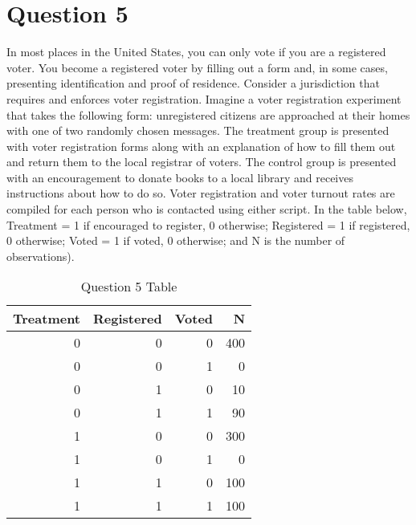 \documentclass[11pt,notitlepage]{article}\usepackage[]{graphicx}\usepackage[]{color}
\begin{document}
\section*{Question 5}
In most places in the United States, you can only vote if you are a registered voter. You become a registered voter by filling out a form and, in some cases, presenting identification and proof of residence. Consider a jurisdiction that requires and enforces voter registration. Imagine a voter registration experiment that takes the following form: unregistered citizens are approached at their homes with one of two randomly chosen messages. The treatment group is presented with voter registration forms along with an explanation of how to fill them out and return them to the local registrar of voters. The control group is presented with an encouragement to donate books to a local library and receives instructions about how to do so. Voter registration and voter turnout rates are compiled for each person who is contacted using either script. In the table below, Treatment = 1 if encouraged to register, 0 otherwise; Registered = 1 if registered, 0 otherwise; Voted = 1 if voted, 0 otherwise; and N is the number of observations).

\begin{table}[H]
  \centering
  \caption{Question 5 Table}
    \begin{tabular}{rrrr}
    \toprule
    Treatment  & Registered  & Voted  & N  \\
    \midrule
    0     & 0     & 0     & 400 \\
    0     & 0     & 1     & 0 \\
    0     & 1     & 0     & 10 \\
    0     & 1     & 1     & 90 \\
    1     & 0     & 0     & 300 \\
    1     & 0     & 1     & 0 \\
    1     & 1     & 0     & 100 \\
    1     & 1     & 1     & 100 \\
    \bottomrule
    \end{tabular}%
  \label{tab:addlabel}%
\end{table}%
\end{document}
